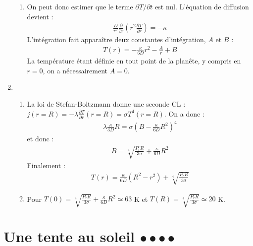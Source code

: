 \begin{correction}
\begin{enumerate}
\begin{enumerate}
	\item On peut donc estimer que le terme $\partial T/\partial t$ est nul. L'équation de diffusion devient :
	\begin{align*}
		\frac{D}{r^2}\frac{\partial }{\partial r}\left( r^2\frac{\partial T}{\partial r}\right) =  -\kappa		
	\end{align*}
	L'intégration fait apparaître deux constantes d'intégration, $A$ et $B$ :
	\begin{align*}
		T(r) = -\frac{\kappa}{6D}r^2-\frac{A}{r}+B
	\end{align*}
	La température étant définie en tout point de la planête, y compris en $r=0$, on a nécessairement $A=0$. 
	
\end{enumerate}

\item

\begin{enumerate}

	 \item La loi de Stefan-Boltzmann donne une seconde CL : $j(r=R)=-\lambda\frac{\partial T}{\partial r}(r=R)=\sigma T^4(r=R)$. On a donc :
	 \begin{align*}
	 	\lambda\frac{\kappa}{3D}R=\sigma\left(B-\frac{\kappa}{6D}R^2\right)^4
	 \end{align*}
	 et donc :
	 \begin{align*}
	 	B = \sqrt[4]{\frac{P_r R}{3\sigma}}+\frac{\kappa}{6D}R^2
	 \end{align*}
	 Finalement :
	 \begin{align*}
	 	T(r) = \frac{\kappa}{6D}\left( R^2 - r^2\right) +\sqrt[4]{\frac{P_r R}{3\sigma}}
	 \end{align*}
	 
	 \item Pour $T(0)=\sqrt[4]{\frac{P_r R}{3\sigma}}+\frac{\kappa}{6D}R^2\simeq63$ K et $T(R)=\sqrt[4]{\frac{P_r R}{3\sigma}}\simeq 20$ K.

\end{enumerate}	

\end{enumerate}

\end{correction}

\newpage

\section{Une tente au soleil $\bullet\bullet\bullet\bullet$}

